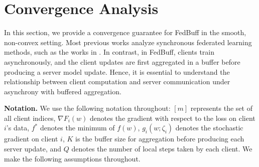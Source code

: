 \documentclass[twoside]{article}
\newcommand{\algname}{{FedBuff}\xspace}
\begin{document}





\section{Convergence Analysis}
\label{sec:convergence}
In this section, we provide a convergence guarantee for \algname{} in the smooth, non-convex setting. Most previous works analyze synchronous federated learning methods, such as the works in \citep{dont_use_minibatch, fedprox, adaptive-fl-optimization, fedavg_conv_Li, Stitch_LocalSGD, restarted_SGD_Yu, li2019communication, haddadpour_localdescent, SCAFFOLD}. In contrast, in \algname{}, clients train asynchronously, and the client updates are first aggregated in a buffer before producing a server model update. Hence, it is essential to understand the relationship between client computation and server communication under asynchrony with buffered aggregation. 

\textbf{Notation.} We use the following notation throughout: $[m]$ represents the set of all client indices, $\nabla F_i(w)$ denotes the gradient with respect to the loss on client $i$'s data, $f^*$ denotes the minimum of $f(w)$, $g_i(w; \zeta_i)$ denotes the stochastic gradient on client $i$, $K$ is the buffer size for aggregation before producing each server update, and $Q$ denotes the number of local steps taken by each client. We make the following assumptions throughout.
\end{document}
